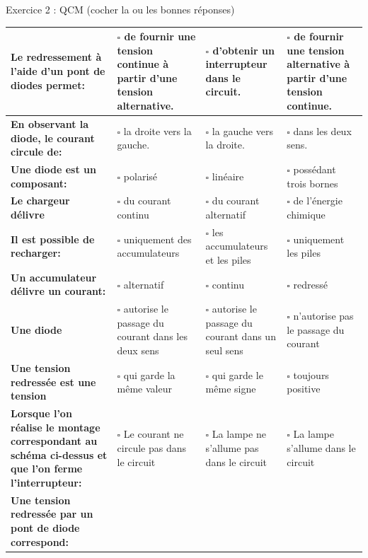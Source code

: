\documentclass[11pt,a4paper]{article}
\begin{document}
\newpage

Exercice 2 : QCM (cocher la ou les bonnes réponses) 

\begin{center}
\begin{tabularx}{\textwidth}{|>{\centering\arraybackslash}m{}|>{\centering\arraybackslash}m{}|>{\centering\arraybackslash}m{}|>{\centering\arraybackslash}m{}|}
\hline
\textbf{Le redressement à l'aide d'un pont de diodes permet:} & $\square$ de fournir une tension continue à partir d'une tension alternative. & $\square$ d'obtenir un interrupteur dans le circuit. & $\square$ de fournir une tension alternative à partir d'une tension continue. \\
\hline
\textbf{En observant la diode, le courant circule de:} & $\square$ la droite vers la gauche. & $\square$ la gauche vers la droite. & $\square$ dans les deux sens. \\
\hline
\textbf{Une diode est un composant:} & $\square$ polarisé & $\square$ linéaire & $\square$ possédant trois bornes \\
\hline
\textbf{Le chargeur délivre} & $\square$ du courant continu & $\square$ du courant alternatif & $\square$ de l'énergie chimique \\
\hline
\textbf{Il est possible de recharger:} & $\square$ uniquement des accumulateurs & $\square$ les accumulateurs et les piles & $\square$ uniquement les piles \\
\hline
\textbf{Un accumulateur délivre un courant:} & $\square$ alternatif & $\square$ continu & $\square$ redressé \\
\hline
\textbf{Une diode} & $\square$ autorise le passage du courant dans les deux sens & $\square$ autorise le passage du courant dans un seul sens & $\square$ n'autorise pas le passage du courant \\
\hline
\textbf{Une tension redressée est une tension} & $\square$ qui garde la même valeur & $\square$ qui garde le même signe & $\square$ toujours positive \\
\hline
\textbf{Lorsque l'on réalise le montage correspondant au schéma ci-dessus et que l'on ferme l'interrupteur:} & $\square$ Le courant ne circule pas dans le circuit & $\square$ La lampe ne s'allume pas dans le circuit & $\square$ La lampe s'allume dans le circuit \\
\hline
\textbf{Une tension redressée par un pont de diode correspond:} & 
\adjustbox{valign=m}{\begin{tabular}{c}

\end{tabular}}
\end{tabularx}
\end{center}
\end{document}
